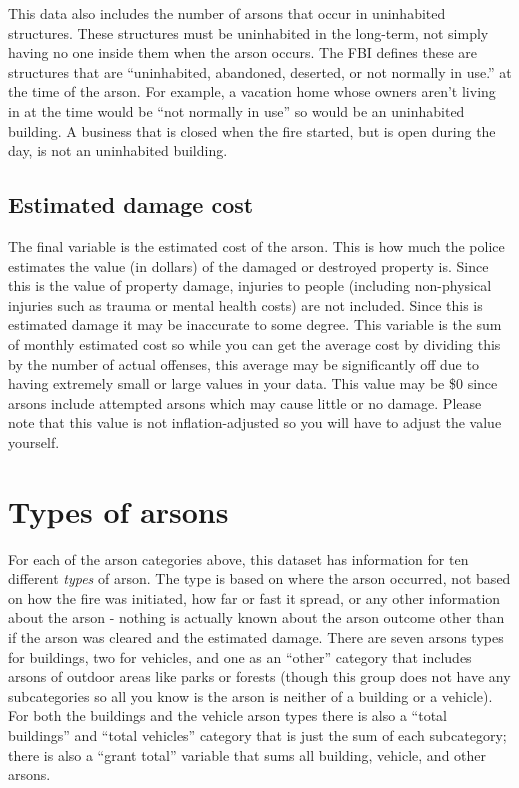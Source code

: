 \documentclass[
  12pt,
  openany]{book}
\begin{document}
This data also includes the number of arsons that occur in uninhabited structures. These structures must be uninhabited in the long-term, not simply having no one inside them when the arson occurs. The FBI defines these are structures that are ``uninhabited, abandoned, deserted, or not normally in use.'' at the time of the arson. For example, a vacation home whose owners aren't living in at the time would be ``not normally in use'' so would be an uninhabited building. A business that is closed when the fire started, but is open during the day, is not an uninhabited building.

\hypertarget{estimated-damage-cost}{%
\subsection{Estimated damage cost}\label{estimated-damage-cost}}

The final variable is the estimated cost of the arson. This is how much the police estimates the value (in dollars) of the damaged or destroyed property is. Since this is the value of property damage, injuries to people (including non-physical injuries such as trauma or mental health costs) are not included. Since this is estimated damage it may be inaccurate to some degree. This variable is the sum of monthly estimated cost so while you can get the average cost by dividing this by the number of actual offenses, this average may be significantly off due to having extremely small or large values in your data. This value may be \$0 since arsons include attempted arsons which may cause little or no damage. Please note that this value is not inflation-adjusted so you will have to adjust the value yourself.

\hypertarget{arsonType}{%
\section{Types of arsons}\label{arsonType}}

For each of the arson categories above, this dataset has information for ten different \emph{types} of arson. The type is based on where the arson occurred, not based on how the fire was initiated, how far or fast it spread, or any other information about the arson - nothing is actually known about the arson outcome other than if the arson was cleared and the estimated damage. There are seven arsons types for buildings, two for vehicles, and one as an ``other'' category that includes arsons of outdoor areas like parks or forests (though this group does not have any subcategories so all you know is the arson is neither of a building or a vehicle). For both the buildings and the vehicle arson types there is also a ``total buildings'' and ``total vehicles'' category that is just the sum of each subcategory; there is also a ``grant total'' variable that sums all building, vehicle, and other arsons.
\end{document}
